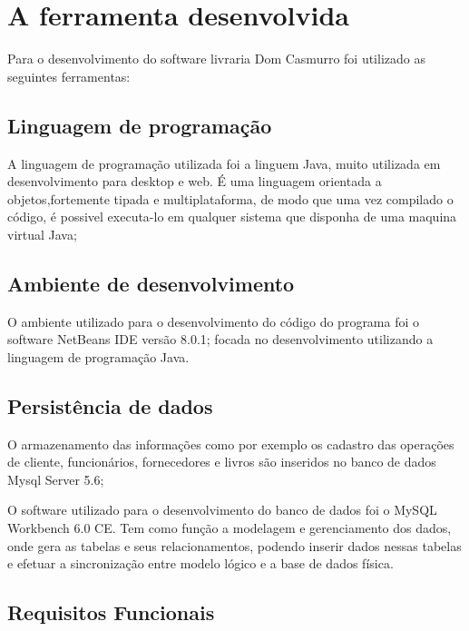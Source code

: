 \chapter{A ferramenta desenvolvida}

Para o desenvolvimento do software livraria Dom Casmurro foi utilizado as seguintes ferramentas:


\section{Linguagem de programação}
 A linguagem de programação utilizada foi a linguem Java, muito utilizada em desenvolvimento para desktop e web. É uma linguagem orientada a objetos,fortemente tipada e multiplataforma, de modo que uma vez compilado o código, é possivel executa-lo em qualquer sistema que disponha de uma maquina virtual Java;

\section{Ambiente de desenvolvimento}
 O ambiente utilizado para o desenvolvimento do código do programa foi o software NetBeans IDE versão 8.0.1; focada no desenvolvimento utilizando a linguagem de programação Java.

\section{Persistência de dados}
 O armazenamento das informações como por exemplo os cadastro das operações de cliente, funcionários, fornecedores e livros são inseridos no banco de dados Mysql Server 5.6;

O software utilizado para o desenvolvimento do banco de dados foi o MySQL Workbench 6.0 CE. Tem como função a modelagem e gerenciamento dos dados, onde gera as tabelas e seus relacionamentos, podendo inserir dados nessas tabelas e efetuar a sincronização entre modelo lógico e a base de dados física.


\section{Requisitos Funcionais}

